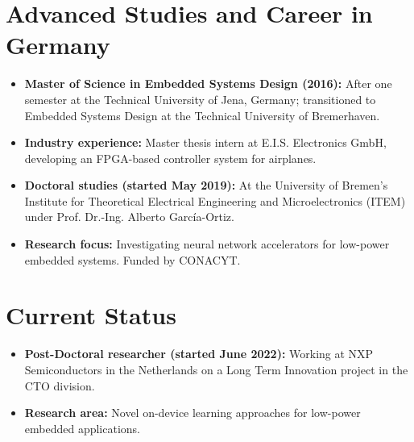 \documentclass{article}
\begin{document}
\section*{Advanced Studies and Career in Germany}
\begin{itemize}[noitemsep]
    \item \textbf{Master of Science in Embedded Systems Design (2016):} After one semester at the Technical University of Jena, Germany; transitioned to Embedded Systems Design at the Technical University of Bremerhaven.
    \item \textbf{Industry experience:} Master thesis intern at E.I.S. Electronics GmbH, developing an FPGA-based controller system for airplanes.
    \item \textbf{Doctoral studies (started May 2019):} At the University of Bremen's Institute for Theoretical Electrical Engineering and Microelectronics (ITEM) under Prof. Dr.-Ing. Alberto García-Ortiz.
    \item \textbf{Research focus:} Investigating neural network accelerators for low-power embedded systems. Funded by CONACYT.
\end{itemize}

\section*{Current Status}
\begin{itemize}[noitemsep]
    \item \textbf{Post-Doctoral researcher (started June 2022):} Working at NXP Semiconductors in the Netherlands on a Long Term Innovation project in the CTO division.
    \item \textbf{Research area:} Novel on-device learning approaches for low-power embedded applications.
\end{itemize}
\end{document}
